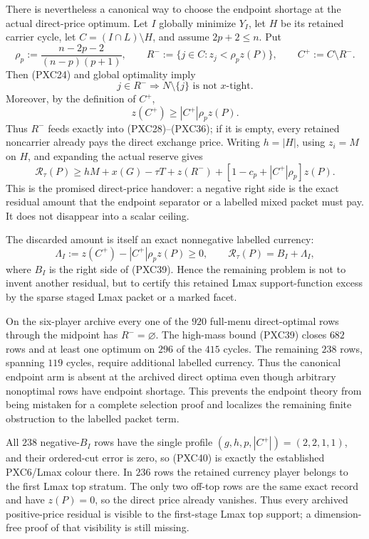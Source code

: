 \documentclass[11pt]{article}
\begin{document}
There is nevertheless a canonical way to choose the endpoint shortage at the
actual direct-price optimum.  Let $I$ globally minimize $Y_I$, let $H$ be its
retained carrier cycle, let $C=(I\cap L)\setminus H$, and assume
$2p+2\le n$.  Put
\[
 \rho_p:=\frac{n-2p-2}{(n-p)(p+1)},\qquad
 R^-:=\{j\in C:z_j<\rho_pz(P)\},\qquad C^+:=C\setminus R^-.
\]
Then (PXC24) and global optimality imply
\[
 j\in R^-\Longrightarrow N\setminus\{j\}
     \text{ is not $x$-tight}.                       \tag{PXC37}
\]
Moreover, by the definition of $C^+$,
\[
 z(C^+)\ge |C^+|\rho_pz(P).                         \tag{PXC38}
\]
Thus $R^-$ feeds exactly into (PXC28)--(PXC36); if it is empty, every
retained noncarrier already pays the direct exchange price.  Writing
$h=|H|$, using $z_i=M$ on $H$, and expanding the actual reserve gives
\[
 \mathcal R_\tau(P)
 \ge hM+x(G)-\tau T+z(R^-)
   +[1-c_p+|C^+|\rho_p]z(P).                        \tag{PXC39}
\]
This is the promised direct-price handover: a negative right side is the
exact residual amount that the endpoint separator or a labelled mixed packet
must pay.  It does not disappear into a scalar ceiling.

The discarded amount is itself an exact nonnegative labelled currency:
\[
 \Lambda_I:=z(C^+)-|C^+|\rho_pz(P)\ge0,
 \qquad
 \mathcal R_\tau(P)=B_I+\Lambda_I,                 \tag{PXC40}
\]
where $B_I$ is the right side of (PXC39).  Hence the remaining problem is not
to invent another residual, but to certify this retained Lmax support-function
excess by the sparse staged Lmax packet or a marked facet.

On the six-player archive every one of the $920$ full-menu direct-optimal
rows through the midpoint has $R^-=\varnothing$.  The high-mass bound
(PXC39) closes $682$ rows and at least one optimum on $296$ of the $415$
cycles.  The remaining $238$ rows, spanning $119$ cycles, require additional
labelled currency.  Thus the canonical endpoint arm is absent at the
archived direct optima even though arbitrary nonoptimal rows have endpoint
shortage.  This prevents the endpoint theory from being mistaken for a
complete selection proof and localizes the remaining finite obstruction to
the labelled packet term.

All $238$ negative-$B_I$ rows have the single profile
$(g,h,p,|C^+|)=(2,2,1,1)$, and their ordered-cut error is zero, so (PXC40)
is exactly the established PXC6/Lmax colour there.  In $236$ rows the retained
currency player belongs to the first Lmax top stratum.  The only two off-top
rows are the same exact record and have $z(P)=0$, so the direct price already
vanishes.  Thus every archived positive-price residual is visible to the
first-stage Lmax top support; a dimension-free proof of that visibility is
still missing.
\end{document}
